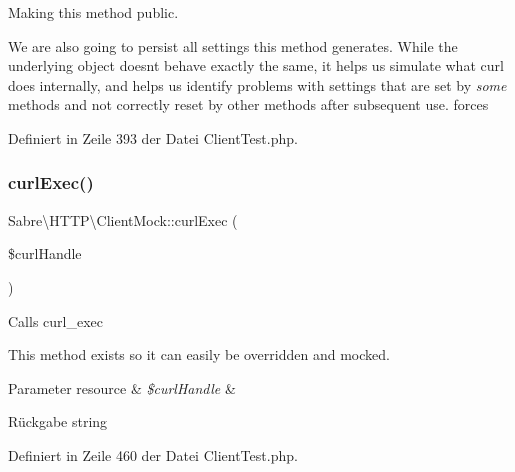 Making this method public.

We are also going to persist all settings this method generates. While the underlying object doesn\textquotesingle{}t behave exactly the same, it helps us simulate what curl does internally, and helps us identify problems with settings that are set by {\itshape some} methods and not correctly reset by other methods after subsequent use. forces 

Definiert in Zeile 393 der Datei Client\+Test.\+php.

\mbox{\label{class_sabre_1_1_h_t_t_p_1_1_client_mock_a8883ea353a5269d0b820e8c0503cadfc}} 
\subsubsection{\texorpdfstring{curl\+Exec()}{curlExec()}}
{\footnotesize\ttfamily Sabre\textbackslash{}\+H\+T\+T\+P\textbackslash{}\+Client\+Mock\+::curl\+Exec (\begin{DoxyParamCaption}\item[{}]{\$curl\+Handle }\end{DoxyParamCaption})\hspace{0.3cm}{\ttfamily [protected]}}

Calls curl\+\_\+exec

This method exists so it can easily be overridden and mocked.


\begin{DoxyParams}[1]{Parameter}
resource & {\em \$curl\+Handle} & \\
\hline
\end{DoxyParams}
\begin{DoxyReturn}{Rückgabe}
string 
\end{DoxyReturn}


Definiert in Zeile 460 der Datei Client\+Test.\+php.

\mbox{\label{class_sabre_1_1_h_t_t_p_1_1_client_mock_adc3f829c4f3cc4f4fc47925fc143363d}} 
